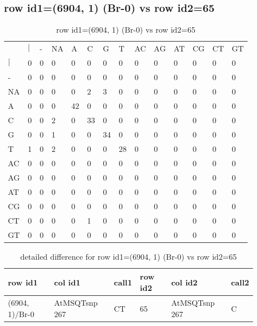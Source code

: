 \subsection{row id1=(6904, 1) (Br-0) vs row id2=65}
\begin{center}
\begin{longtable}{|l|l|l|l|l|l|l|l|l|l|l|l|l|l|}
\caption{row id1=(6904, 1) (Br-0) vs row id2=65} \label{table_dm70}\\
\hline
\\
\hline
&$|$&-&NA&A&C&G&T&AC&AG&AT&CG&CT&GT\\
$|$&0&0&0&0&0&0&0&0&0&0&0&0&0\\
-&0&0&0&0&0&0&0&0&0&0&0&0&0\\
NA&0&0&0&0&2&3&0&0&0&0&0&0&0\\
A&0&0&0&42&0&0&0&0&0&0&0&0&0\\
C&0&0&2&0&33&0&0&0&0&0&0&0&0\\
G&0&0&1&0&0&34&0&0&0&0&0&0&0\\
T&1&0&2&0&0&0&28&0&0&0&0&0&0\\
AC&0&0&0&0&0&0&0&0&0&0&0&0&0\\
AG&0&0&0&0&0&0&0&0&0&0&0&0&0\\
AT&0&0&0&0&0&0&0&0&0&0&0&0&0\\
CG&0&0&0&0&0&0&0&0&0&0&0&0&0\\
CT&0&0&0&0&1&0&0&0&0&0&0&0&0\\
GT&0&0&0&0&0&0&0&0&0&0&0&0&0\\
\hline
\end{longtable}
\end{center}

\begin{center}
\begin{longtable}{|l|l|l|l|l|l|}
\caption{detailed difference for row id1=(6904, 1) (Br-0) vs row id2=65} \label{table_dm71}\\
\hline
row id1&col id1&call1&row id2&col id2&call2\\
\hline
(6904, 1)/Br-0&AtMSQTsnp 267&CT&65&AtMSQTsnp 267&C\\
\hline
\end{longtable}
\end{center}

